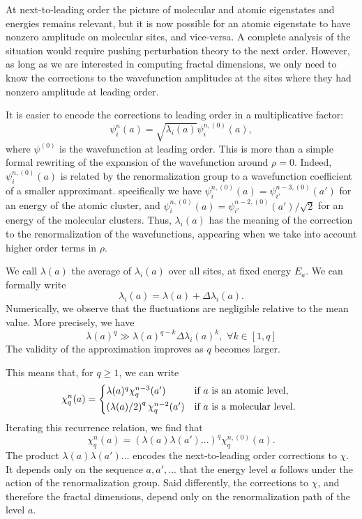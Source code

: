\documentclass[11pt]{article}
\begin{document}
At next-to-leading order the picture of molecular and atomic eigenstates and energies remains relevant, but it is now possible for an atomic eigenstate to have nonzero amplitude on molecular sites, and vice-versa.
A complete analysis of the situation would require pushing perturbation theory to the next order.
However, as long as we are interested in computing fractal dimensions, we only need to know the corrections to the wavefunction amplitudes at the sites where they had nonzero amplitude at leading order.

It is easier to encode the corrections to leading order in a multiplicative factor:
\begin{equation}
	\psi_i^n(a) = \sqrt{\lambda_i(a)} \psi^{n,(0)}_i(a),
\end{equation}
where $\psi^{(0)}$ is the wavefunction at leading order. This is more than a simple formal rewriting of the expansion of the wavefunction around $\rho = 0$. Indeed, $\psi^{n,(0)}_i(a)$ is related by the renormalization group to a wavefunction coefficient of a smaller approximant.
specifically we have $\psi^{n,(0)}_i(a) = \psi^{n-3,(0)}_{i'}(a')$ for an energy of the atomic cluster, and $\psi^{n,(0)}_i(a) = \psi^{n-2,(0)}_{i'}(a')/\sqrt{2}$ for an energy of the molecular clusters.
Thus, $\lambda_i(a)$ has the meaning of the correction to the renormalization of the wavefunctions, appearing when we take into account higher order terms in $\rho$. 

We call $\lambda(a)$ the average of $\lambda_i(a)$ over all sites, at fixed energy $E_a$.
We can formally write
\begin{equation}
	\lambda_i(a) = \lambda(a) + \Delta \lambda_i(a).
\end{equation}
Numerically, we observe that the fluctuations are negligible relative to the mean value. More precisely, we have
\begin{equation}
	\lambda(a)^q \gg \lambda(a)^{q-k} \Delta \lambda_i(a)^k, \text{~} \forall k \in [1,q]
\end{equation}
The validity of the approximation improves as $q$ becomes larger.

This means that, for $q \geq 1$, we can write
\begin{equation}
	\chi_q^n(a) = \begin{cases*}
	\lambda(a)^q \chi_q^{n-3}(a') & if $a$ is an atomic level, \\
	\left(\lambda(a)/2\right)^q \chi_q^{n-2}(a') & if $a$ is a molecular level. \\
	\end{cases*}
\end{equation}
Iterating this recurrence relation, we find that 
\begin{equation}
\label{eq:rec_chi}
	\chi_q^n(a) = \left( \lambda(a) \lambda(a')... \right)^q \chi_q^{n,(0)}(a).
\end{equation}
The product $\lambda(a)\lambda(a')...$ encodes the next-to-leading order corrections to $\chi$. 
It depends only on the sequence $a, a', ...$ that the energy level $a$ follows under the action of the renormalization group.
Said differently, the corrections to $\chi$, and therefore the fractal dimensions, depend only on the renormalization path of the level $a$.
\end{document}

